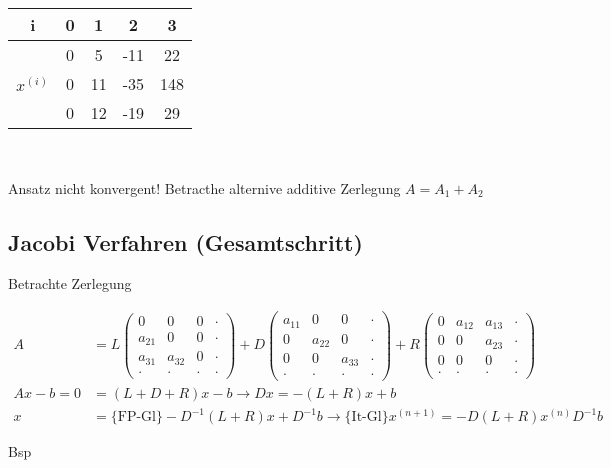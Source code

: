 \documentclass[a4paper,ngerman]{scrbook}
\begin{document}
\begin{center}
  \begin{tabular}{c|c|c|c|c|}
    i & 0 & 1 & 2 & 3\\\hline
    \multirow{3}{*}{$x^{(i)}$} & 0 & 5 & -11 & 22\\\cline{2-5}
    & 0 & 11 & -35 & 148\\\cline{2-5}
    & 0 & 12 & -19 & 29
  \end{tabular}\\
\end{center}
Ansatz nicht konvergent! Betracthe alternive additive Zerlegung $A = A_1 + A_2$

\subsection{Jacobi Verfahren (Gesamtschritt)}
\label{sec:jacobi-gesamt}

Betrachte Zerlegung


\begin{align*}
  A &= L
  \begin{pmatrix}
    0 & 0 & 0 & \cdot\\
    a_{21} & 0 & 0 & \cdot\\
    a_{31} & a_{32} & 0 & \cdot\\
    \cdot & \cdot & \cdot & \cdot
  \end{pmatrix}
  + D
  \begin{pmatrix}
    a_11 & 0 & 0 & \cdot\\
    0 & a_{22} & 0 & \cdot\\
    0 & 0 & a_{33} & \cdot\\
    \cdot &\cdot &\cdot &\cdot
  \end{pmatrix}
  + R
  \begin{pmatrix}
    0 & a_{12} & a_{13} & \cdot\\
    0 & 0 & a_{23} & \cdot\\
    0 & 0 & 0 & \cdot\\
    \cdot &\cdot &\cdot &\cdot
  \end{pmatrix}\\
  Ax-b = 0 &= (L + D + R)x-b \to Dx = -(L+R)x+b\\
  x &= \{\text{FP-Gl}\}-D^{-1}(L+R)x + D^{-1}b \to \{\text{It-Gl}\}x^{(n+1)} = -D(L+R)x^{(n)}  D^{-1} b
\end{align*}

Bsp
\end{document}

